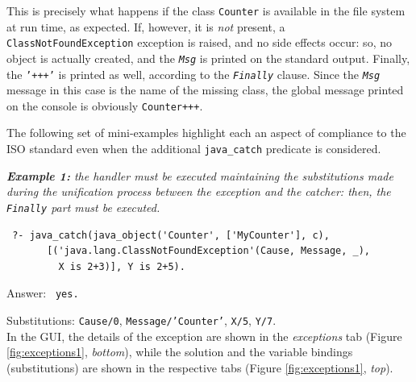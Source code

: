 This is precisely what happens if the class \texttt{Counter} is available in the file system at run time, as expected. If, however, it is \textit{not} present, a \texttt{ClassNotFoundException} exception is raised, and no side effects occur: so, no object is actually created, and the \texttt{\textit{Msg}} is printed on the standard output. Finally, the \texttt{'+++'} is printed as well, according to the \texttt{\textit{Finally}} clause.
Since the \texttt{\textit{Msg}} message in this case is the name of the missing class, the global message printed on the console is obviously \texttt{Counter+++}.

The following set of mini-examples highlight each an aspect of \tuprolog{} compliance to the ISO standard even when the additional \texttt{java\_catch} %
predicate is considered.

\medskip\noindent
\textit{\textbf{Example 1:} the handler must be executed maintaining the substitutions made during the unification process between the exception and the catcher: then, the \texttt{Finally} part must be executed.}
\begin{verbatim}
 ?- java_catch(java_object('Counter', ['MyCounter'], c),
       [('java.lang.ClassNotFoundException'(Cause, Message, _),
         X is 2+3)], Y is 2+5).
\end{verbatim}

Answer: \texttt{ yes.}

Substitutions: \texttt{Cause/0}, \texttt{Message/'Counter'}, \texttt{X/5}, \texttt{Y/7}.\\

\noindent In the \tuprolog{} GUI, the details of the exception are shown in the \textit{exceptions} tab (Figure \ref{fig:exceptions1}, \textit{bottom}), while the solution and the variable bindings (substitutions) are shown in the respective tabs (Figure \ref{fig:exceptions1}, \textit{top}).


